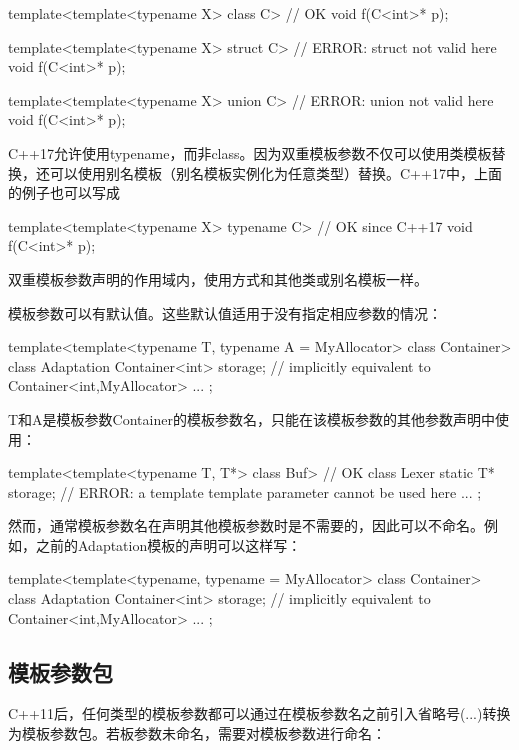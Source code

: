 \begin{cpp}
template<template<typename X> class C> // OK
void f(C<int>* p);

template<template<typename X> struct C> // ERROR: struct not valid here
void f(C<int>* p);

template<template<typename X> union C> // ERROR: union not valid here
void f(C<int>* p);
\end{cpp}

C++17允许使用typename，而非class。因为双重模板参数不仅可以使用类模板替换，还可以使用别名模板（别名模板实例化为任意类型）替换。C++17中，上面的例子也可以写成

\begin{cpp}
template<template<typename X> typename C> // OK since C++17
void f(C<int>* p);
\end{cpp}

双重模板参数声明的作用域内，使用方式和其他类或别名模板一样。

模板参数可以有默认值。这些默认值适用于没有指定相应参数的情况：

\begin{cpp}
template<template<typename T,
				  typename A = MyAllocator> class Container>
class Adaptation {
	Container<int> storage; // implicitly equivalent to Container<int,MyAllocator>
	...
};
\end{cpp}

T和A是模板参数Container的模板参数名，只能在该模板参数的其他参数声明中使用：

\begin{cpp}
template<template<typename T, T*> class Buf> // OK
class Lexer {
	static T* storage; // ERROR: a template template parameter cannot be used here
	...
};
\end{cpp}

然而，通常模板参数名在声明其他模板参数时是不需要的，因此可以不命名。例如，之前的Adaptation模板的声明可以这样写：

\begin{cpp}
template<template<typename,
				  typename = MyAllocator> class Container>
class Adaptation {
	Container<int> storage; // implicitly equivalent to Container<int,MyAllocator>
	...
};
\end{cpp}

\subsection{模板参数包}

C++11后，任何类型的模板参数都可以通过在模板参数名之前引入省略号(...)转换为模板参数包。若板参数未命名，需要对模板参数进行命名：

